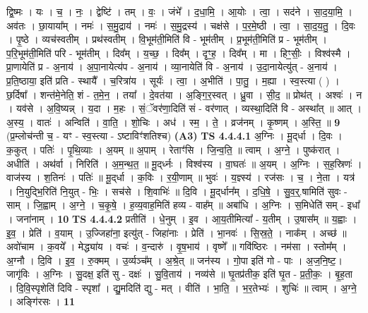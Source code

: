 \documentclass[17pt]{extarticle}
\begin{document}
                  द्वि॒ष्मः । यः । च॒ । नः॒ । द्वेष्टि॑ । तम् । वः॒ । जंभे᳚ । द॒धा॒मि॒ । आ॒योः । त्वा॒ । सद॑ने । सा॒द॒या॒मि॒ । अव॑तः । छा॒याया᳚म् । नमः॑ । स॒मु॒द्राय॑ । नमः॑ । स॒मु॒द्रस्य॑ । चक्ष॑से । प॒र॒मे॒ष्ठी । त्वा॒ । सा॒द॒य॒तु॒ । दि॒वः । पृ॒ष्ठे । व्यच॑स्वतीम् । प्रथ॑स्वतीम् । वि॒भूम॑ती॒मिति॑ वि - भूम॑तीम् । प्र॒भूम॑ती॒मिति॑ प्र - भूम॑तीम् । प॒रि॒भूम॑ती॒मिति॑ परि - भूम॑तीम् । दिव᳚म् । य॒च्छ॒ । दिव᳚म् । दृꣳ॒॒ह॒ । दिव᳚म् । मा । हिꣳ॒॒सीः॒ । विश्व॑स्मै । प्रा॒णायेति॑ प्र - अ॒नाय॑ । अ॒पा॒नायेत्य॑प - अ॒नाय॑ । व्या॒नायेति॑ वि - अ॒नाय॑ । उ॒दा॒नायेत्यु॑त् - अ॒नाय॑ । प्र॒ति॒ष्ठाया॒ इति॑ प्रति - स्थायै᳚ । च॒रित्रा॑य । सूर्यः॑ । त्वा॒ । अ॒भीति॑ । पा॒तु॒ । म॒ह्या । स्व॒स्त्या ( ) । छ॒र्दिषा᳚ । शन्त॑मे॒नेति॒ शं - त॒मे॒न॒ । तया᳚ । दे॒वत॑या । अ॒ङ्गि॒र॒स्वत् । ध्रु॒वा । सी॒द॒ ॥ प्रोथ॑त् । अश्वः॑ । न । यव॑से । अ॒वि॒ष्यन्न् । य॒दा । म॒हः । सं॒ॅवर॑णा॒दिति॑ सं - वर॑णात् । व्यस्था॒दिति॑ वि - अस्था᳚त् ॥ आत् । अ॒स्य॒ । वातः॑ । अन्विति॑ । वा॒ति॒ । शो॒चिः । अध॑ । स्म॒ । ते॒ । व्रज॑नम् । कृ॒ष्णम् । अ॒स्ति॒ ॥ \textbf{  9} \newline
                  \newline
                      (प्र॒म्लोच॑न्ती च॒ - यꣳ - स्व॒स्त्या - ऽष्टाविꣳ॑शतिश्च)  \textbf{(A3)} \newline \newline
                                \textbf{ TS 4.4.4.1} \newline
                  अ॒ग्निः । मू॒द्‌र्धा । दि॒वः । क॒कुत् । पतिः॑ । पृ॒थि॒व्याः । अ॒यम् ॥ अ॒पाम् । रेताꣳ॑सि । जि॒न्व॒ति॒ ॥ त्वाम् । अ॒ग्ने॒ । पुष्क॑रात् । अधीति॑ । अथ॑र्वा । निरिति॑ । अ॒म॒न्थ॒त॒ ॥ मू॒द्‌र्ध्नः । विश्व॑स्य । वा॒घतः॑ ॥ अ॒यम् । अ॒ग्निः । स॒ह॒स्रिणः॑ । वाज॑स्य । श॒तिनः॑ । पतिः॑ ॥ मू॒द्‌र्धा । क॒विः । र॒यी॒णाम् ॥ भुवः॑ । य॒ज्ञ्स्य॑ । रज॑सः । च॒ । ने॒ता । यत्र॑ । नि॒युद्भि॒रिति॑ नि॒युत् - भिः॒ । सच॑से । शि॒वाभिः॑ ॥ दि॒वि । मू॒द्‌र्धान᳚म् । द॒धि॒षे॒ । सु॒व॒र्॒.षामिति॑ सुवः - साम् । जि॒ह्वाम् । अ॒ग्ने॒ । च॒कृ॒षे॒ । ह॒व्य॒वाह॒मिति॑ हव्य - वाह᳚म् ॥ अबा॑धि । अ॒ग्निः । स॒मिधेति॑ सम् - इधा᳚ । जना॑नाम् । \textbf{  10} \newline
                  \newline
                                \textbf{ TS 4.4.4.2} \newline
                  प्रतीति॑ । धे॒नुम् । इ॒व । आ॒य॒तीमित्या᳚ - य॒तीम् । उ॒षास᳚म् ॥ य॒ह्वाः । इ॒व॒ । प्रेति॑ । व॒याम् । उ॒ज्जिहा॑ना॒ इत्यु॑त् - जिहा॑नाः । प्रेति॑ । भा॒नवः॑ । सि॒स्र॒ते॒ । नाक᳚म् । अच्छ॑ ॥ अवो॑चाम । क॒वये᳚ । मेद्ध्या॑य । वचः॑ । व॒न्दारु॑ । वृ॒ष॒भाय॑ । वृष्णे᳚ ॥ गवि॑ष्ठिरः । नम॑सा । स्तोम᳚म् । अ॒ग्नौ । दि॒वि । इ॒व॒ । रु॒क्मम् । उ॒र्व्यञ्च᳚म् । अ॒श्रे॒त् ॥ जन॑स्य । गो॒पा इति॑ गो - पाः । अ॒ज॒नि॒ष्ट॒। जागृ॑विः । अ॒ग्निः । सु॒दक्ष॒ इति॑ सु - दक्षः॑ । सु॒वि॒ताय॑ । नव्य॑से ॥ घृ॒तप्र॑तीक॒ इति॑ घृ॒त - प्र॒ती॒कः॒ । बृ॒ह॒ता । दि॒वि॒स्पृशेति॑ दिवि - स्पृशा᳚ । द्यु॒मदिति॑ द्यु - मत् । वीति॑ । भा॒ति॒ । भ॒र॒तेभ्यः॑ । शुचिः॑ ॥ त्वाम् । अ॒ग्ने॒ । अङ्गि॑रसः । \textbf{  11} \newline
\end{document}
